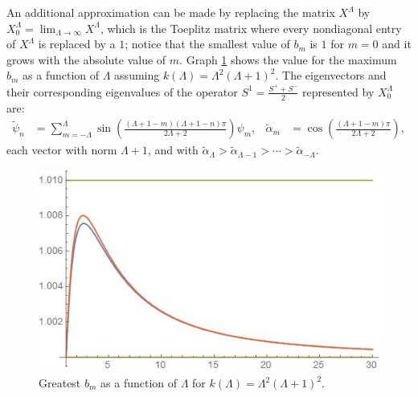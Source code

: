 An additional approximation can be made by replacing the matrix $X^\Lambda$ by $X^\Lambda_0 = \lim_{\Lambda \to \infty} X^\Lambda$, which is the Toeplitz matrix where every nondiagonal entry of $X^\Lambda$ is replaced by a $1$; notice that the smallest value of $b_m$ is $1$ for $m = 0$ and it grows with the absolute value of $m$. Graph \ref{fig:bn} shows the value for the maximum $b_m$ as a function of $\Lambda$ assuming $k(\Lambda) = \Lambda^2(\Lambda+1)^2$. The eigenvectors and their corresponding eigenvalues of the operator $S^1 = \frac{S^+ + S^-}{2}$ represented by $X^\Lambda_0$ are:
\begin{align}
    \tilde \psi_{n} &= \sum_{m = -\Lambda}^\Lambda \sin{\left(\frac{(\Lambda + 1-m)(\Lambda + 1-n)\pi}{2\Lambda + 2}\right)} \psi_m,&
    \tilde \alpha_m &= \cos{\left(\frac{(\Lambda + 1-m)\pi}{2\Lambda + 2}\right)},
\end{align}
each vector with norm $\Lambda + 1$, and with $\tilde \alpha_{\Lambda} > \tilde \alpha_{\Lambda-1} > \cdots > \tilde \alpha_{-\Lambda} $.

\begin{figure}
    \centering
    \includegraphics{images/bn.jpg}
    \caption{Greatest $b_m$ as a function of $\Lambda$ for $k(\Lambda) = \Lambda^2(\Lambda+1)^2$.}
    \label{fig:bn}
\end{figure}

